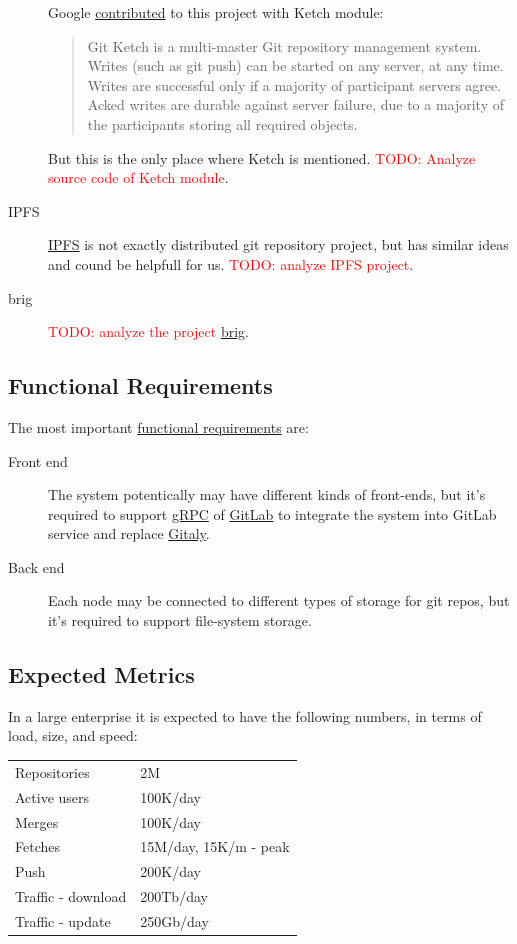 \documentclass[12pt,oneside]{article}
\newcommand{\todo}[1]{\textcolor{red}{TODO: #1}}
\begin{document}
\begin{description}
    Google \href{https://www.eclipse.org//lists/jgit-dev/msg03073.html}{contributed} to this project with Ketch module:
    \begin{quote}
      Git Ketch is a multi-master Git repository management system. Writes
      (such as git push) can be started on any server, at any time. Writes
      are successful only if a majority of participant servers agree.
      Acked writes are durable against server failure, due to a majority of
      the participants storing all required objects.
    \end{quote}
    But this is the only place where Ketch is mentioned. \todo{Analyze source code of Ketch module}.
  \item[IPFS]
    \href{https://ipfs.io/}{IPFS} is not exactly distributed git repository project, but has similar ideas
    and cound be helpfull for us. \todo{analyze IPFS project}.
  \item[brig]
    \todo{analyze the project} \href{https://github.com/sahib/brig}{brig}.
\end{description}

\subsection{Functional Requirements}
\label{sec:nfr}

The most important \href{https://en.wikipedia.org/wiki/Functional_requirement}{functional requirements} are:

\begin{description}
  \item[Front end]
    The system potentically may have different kinds of front-ends,
    but it's required to support \href{https://grpc.io/}{gRPC}
    of \href{https://about.gitlab.com/}{GitLab} to integrate the system
    into GitLab service and replace
    \href{https://docs.gitlab.com/ee/administration/gitaly/}{Gitaly}.
  \item[Back end]
    Each node may be connected to different types of storage for git repos,
    but it's required to support file-system storage.
\end{description}

\subsection{Expected Metrics}
\label{ref:metrics}

In a large enterprise it is expected to have the following
numbers, in terms of load, size, and speed:

\begin{tabular}{ll}
  Repositories & 2M \\
  Active users & 100K/day \\
  Merges & 100K/day \\
  Fetches & 15M/day, 15K/m - peak \\
  Push & 200K/day \\
  Traffic - download & 200Tb/day \\
  Traffic - update & 250Gb/day \\
\end{tabular}

\printbibliography%
\end{document}
